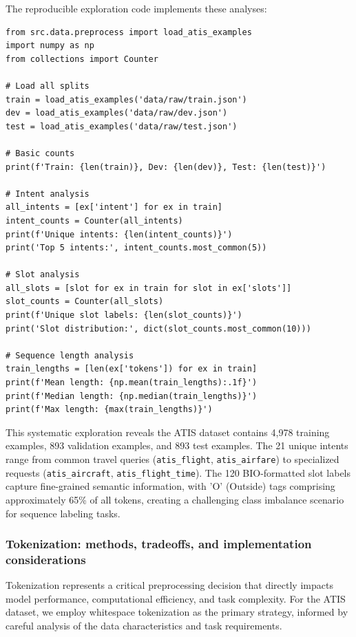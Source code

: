 \documentclass[conference]{IEEEtran}
\begin{document}
The reproducible exploration code implements these analyses:
\begin{verbatim}
from src.data.preprocess import load_atis_examples
import numpy as np
from collections import Counter

# Load all splits
train = load_atis_examples('data/raw/train.json')
dev = load_atis_examples('data/raw/dev.json')
test = load_atis_examples('data/raw/test.json')

# Basic counts
print(f'Train: {len(train)}, Dev: {len(dev)}, Test: {len(test)}')

# Intent analysis
all_intents = [ex['intent'] for ex in train]
intent_counts = Counter(all_intents)
print(f'Unique intents: {len(intent_counts)}')
print('Top 5 intents:', intent_counts.most_common(5))

# Slot analysis
all_slots = [slot for ex in train for slot in ex['slots']]
slot_counts = Counter(all_slots)
print(f'Unique slot labels: {len(slot_counts)}')
print('Slot distribution:', dict(slot_counts.most_common(10)))

# Sequence length analysis
train_lengths = [len(ex['tokens']) for ex in train]
print(f'Mean length: {np.mean(train_lengths):.1f}')
print(f'Median length: {np.median(train_lengths)}')
print(f'Max length: {max(train_lengths)}')
\end{verbatim}

This systematic exploration reveals the ATIS dataset contains 4,978 training examples, 893 validation examples, and 893 test examples. The 21 unique intents range from common travel queries (\texttt{atis\_flight}, \texttt{atis\_airfare}) to specialized requests (\texttt{atis\_aircraft}, \texttt{atis\_flight\_time}). The 120 BIO-formatted slot labels capture fine-grained semantic information, with 'O' (Outside) tags comprising approximately 65\% of all tokens, creating a challenging class imbalance scenario for sequence labeling tasks.

\subsubsection{Tokenization: methods, tradeoffs, and implementation considerations}

Tokenization represents a critical preprocessing decision that directly impacts model performance, computational efficiency, and task complexity. For the ATIS dataset, we employ whitespace tokenization as the primary strategy, informed by careful analysis of the data characteristics and task requirements.
\end{document}
